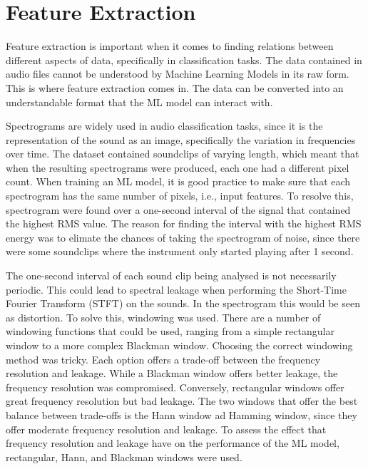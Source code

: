 % 
% 
% 
\section{Feature Extraction \label{ch:Feature_Extraction}}
\vspace{0.5cm}

Feature extraction is important when it comes to finding relations between different aspects of data, specifically in classification tasks. The data contained in audio files cannot be understood by Machine Learning Models in its raw form. This is where feature extraction comes in. The data can be converted into an understandable format that the ML model can interact with. 

Spectrograms are widely used in audio classification tasks, since it is the representation of the sound as an image, specifically the variation in frequencies over time. The dataset contained soundclips of varying length, which meant that when the resulting spectrograms were produced, each one had a different pixel count. When training an ML model, it is good practice to make sure that each spectrogram has the same number of pixels, i.e., input features. To resolve this, spectrogram were found over a one-second interval of the signal that contained the highest RMS value. The reason for finding the interval with the highest RMS energy was to elimate the chances of taking the spectrogram of noise, since there were some soundclips where the instrument only started playing after 1 second. 

The one-second interval of each sound clip being analysed is not necessarily periodic. This could lead to spectral leakage when performing the Short-Time Fourier Transform (STFT) on the sounds. In the spectrogram this would be seen as distortion. To solve this, windowing was used. There are a number of windowing functions that could be used, ranging from a simple rectangular window to a more complex Blackman window. Choosing the correct windowing method was tricky. Each option offers a trade-off between the frequency resolution and leakage. While a Blackman window offers better leakage, the frequency resolution was compromised. Conversely, rectangular windows offer great frequency resolution but bad leakage. The two windows that offer the best balance between trade-offs is the Hann window ad Hamming window, since they offer moderate frequency resolution and leakage. To assess the effect that frequency resolution and leakage have on the performance of the ML model, rectangular, Hann, and Blackman windows were used. 

